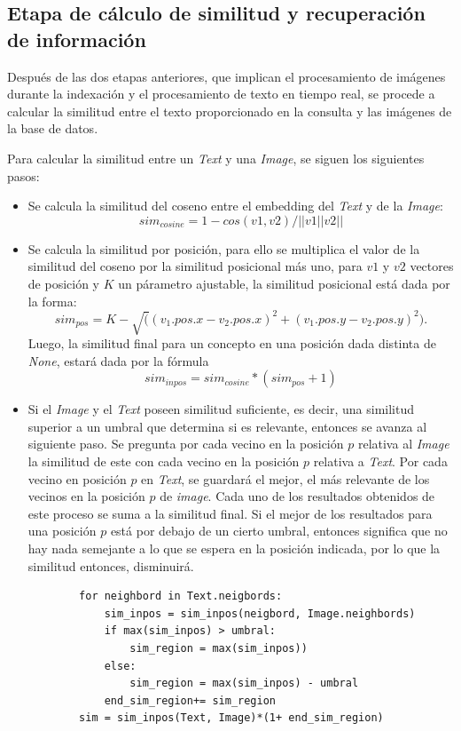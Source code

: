 \subsection{Etapa de cálculo de similitud y recuperación de información}

Después de las dos etapas anteriores, que implican el procesamiento de imágenes durante la indexación y el procesamiento de texto en tiempo real, se procede a calcular la similitud entre el texto proporcionado en la consulta y las imágenes de la base de datos.

Para calcular la similitud entre un \textit{Text} y una \textit{Image}, se siguen los siguientes pasos:
\begin{itemize}

    \item  Se calcula la similitud del coseno entre el embedding del \textit{Text} y de la \textit{Image}: 
    \[sim_{cosine} = 1- cos(v1,v2)/||v1||v2||\]

    \item  Se calcula la similitud por posici\'on, para ello se multiplica el valor de la similitud del coseno por la similitud posicional m\'as uno, para $v1$ y $v2$ vectores de posici\'on y $K$ un p\'arametro ajustable, la similitud posicional est\'a dada por la forma: 
        \[sim_{pos} = K- \sqrt((v_1.pos.x - v_2.pos.x)^2+(v_1.pos.y - v_2.pos.y)^2).\]
    Luego, la similitud final para un concepto en una posici\'on dada distinta de \textit{None}, estar\'a dada por la f\'ormula
            \[sim_{inpos} = sim_{cosine} *(sim_{pos}+1)\]
    
    \item Si el \textit{Image} y el \textit{Text} poseen similitud suficiente, es decir, una similitud superior a un umbral que determina si es relevante, entonces se avanza al siguiente paso. Se pregunta por cada vecino en la posici\'on $p$ relativa al \textit{Image} la similitud de este con cada vecino en la posición $p$ relativa a \textit{Text}. Por cada vecino en posici\'on $p$ en \textit{Text}, se guardar\'a el mejor, el m\'as relevante de los vecinos en la posici\'on $p$ de \textit{image}. Cada uno de los resultados obtenidos de este proceso se suma a la similitud final. Si el mejor de los resultados para una posición $p$ está por debajo de un cierto umbral, entonces significa que no hay nada semejante a lo que se espera en la posición indicada, por lo que la similitud entonces, disminuirá.

    \begin{verbatim}
        for neighbord in Text.neigbords:
            sim_inpos = sim_inpos(neigbord, Image.neighbords)
            if max(sim_inpos) > umbral:
                sim_region = max(sim_inpos))
            else:
                sim_region = max(sim_inpos) - umbral
            end_sim_region+= sim_region
        sim = sim_inpos(Text, Image)*(1+ end_sim_region)
    \end{verbatim}
            

\end{itemize}
